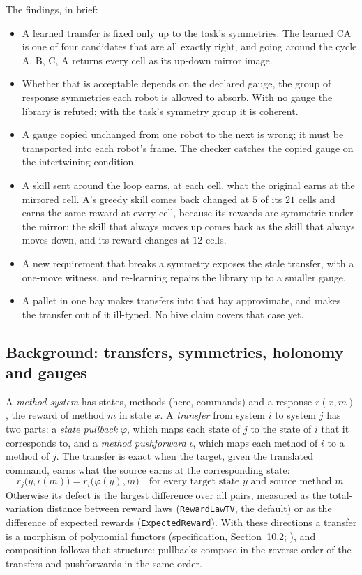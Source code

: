 \documentclass[11pt]{article}
\newcommand{\code}[1]{\texttt{#1}}
\newcommand{\spec}[1]{specification, Section~#1}
\theoremstyle{definition}
\theoremstyle{plain}
\begin{document}
The findings, in brief:
\begin{itemize}
\item A learned transfer is fixed only up to the task's symmetries. The learned CA is one of four
candidates that are all exactly right, and going around the cycle A, B, C, A returns every cell as
its up-down mirror image.
\item Whether that is acceptable depends on the declared gauge, the group of response symmetries
each robot is allowed to absorb. With no gauge the library is refuted; with the task's symmetry
group it is coherent.
\item A gauge copied unchanged from one robot to the next is wrong; it must be transported into
each robot's frame. The checker catches the copied gauge on the intertwining condition.
\item A skill sent around the loop earns, at each cell, what the original earns at the mirrored
cell. A's greedy skill comes back changed at $5$ of its $21$ cells and earns the same reward at
every cell, because its rewards are symmetric under the mirror; the skill that always moves up comes
back as the skill that always moves down, and its reward changes at $12$ cells.
\item A new requirement that breaks a symmetry exposes the stale transfer, with a one-move witness,
and re-learning repairs the library up to a smaller gauge.
\item A pallet in one bay makes transfers into that bay approximate, and makes the transfer out of
it ill-typed. No hive claim covers that case yet.
\end{itemize}

\subsection{Background: transfers, symmetries, holonomy and gauges}\label{sec:ex3background}

A \emph{method system} has states, methods (here, commands) and a response $r(x,m)$, the reward
of method $m$ in state $x$. A \emph{transfer} from system $i$ to system $j$ has two parts: a
\emph{state pullback} $\varphi$, which maps each state of $j$ to the state of $i$ that it
corresponds to, and a \emph{method pushforward} $\iota$, which maps each method of $i$ to a method of
$j$. The transfer is exact when the target, given the translated command, earns what the source
earns at the corresponding state:
\[
r_j\bigl(y,\iota(m)\bigr)=r_i\bigl(\varphi(y),m\bigr)\quad\text{for every target state $y$ and source method $m$.}
\]
Otherwise its defect is the largest difference over all pairs, measured as the total-variation
distance between reward laws (\code{RewardLawTV}, the default) or as the difference of expected
rewards (\code{ExpectedReward}). With these directions a transfer is a morphism of polynomial
functors (\spec{10.2}; \cite{poly}), and composition follows that structure: pullbacks compose in
the reverse order of the transfers and pushforwards in the same order.
\end{document}
